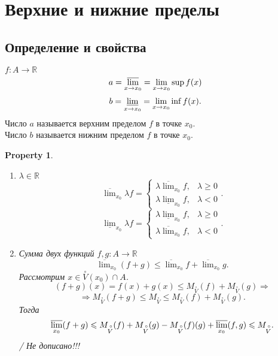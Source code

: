 \documentclass[11pt]{book}
\newcommand{\R}{\mathbb{R}}
\newcommand{\pivi}{\stackrel \circ }
\renewcommand{\le}{\leqslant}
\renewcommand{\ge}{\geqslant}
\theoremstyle{definition}
\theoremstyle{plain}
\theoremstyle{plain}
\newtheorem*{prop}{Property}
\theoremstyle{definition}
\theoremstyle{remark}
\begin{document}
\section{Верхние и нижние пределы}
\subsection{Определение и свойства}\label{ques_30}
\begin{defn}
    $f: A \to \R$\\
    \[
	a = \varlimsup_{x \to x_0}=\lim\limits_{x \to x_0} \sup f(x)
    \]\[
    b = \varliminf_{x \to x_0}=\lim\limits_{x \to x_0} \inf f(x)
    .\] 
    Число $a$ называется верхним пределом $f$ в точке $x_0$. \\
Число $b$ называется нижним пределом $f$ в точке $x_0$.
\end{defn}
\begin{prop}
    \begin{enumerate}
        \item $\lambda \in \R$ 
	    \[
		\overline \lim_{x_0} \lambda f = \left \{
		    \begin{array}{ll}
			\lambda \overline \lim_{x_0} f, & \lambda \ge 0\\
			\lambda \underline \lim_{x_0} f, & \lambda <0
		    \end{array}
		    \right .
	    .\] 
	    \[
		\underline \lim_{x_0} \lambda f = \left \{
		    \begin{array}{ll}
			\lambda \underline \lim_{x_0} f, & \lambda \ge 0\\
			\lambda \overline \lim_{x_0} f, & \lambda <0
		    \end{array}
		    \right .
	    .\] 
	\item Сумма двух функций $f, g : A \to \R$\\
	    \[
		\overline {\lim}_{x_0} (f+g) \le \overline\lim_{x_0} f + \overline \lim_{x_0} g
	    .\] 
	    Рассмотрим $x \in \pivi V(x_0)\cap A$.
	    \[
		(f+g)(x) = f(x) + g(x) \le M_{\pivi V} (f) + M_{\pivi V} (g) \Rightarrow 
	    \] 
	    \[
		\Rightarrow M_{\pivi V}  (f + g) \le M_{\pivi V} \le  M_{\pivi V} (f) + M_{\pivi V} (g) 
	    .\] 
	    Тогда 
	    \[
		\varlimsup _{x_0} (f+g) \le M_{\pivi V} (f) + M_{\pivi V}(g) - M_{\pivi V}(f)(g) + \varlimsup_{x_0}(f, g) \le M_{\pivi V} 
	    .\] 
	    / Не дописано!!!
    \end{enumerate}
\end{prop}
\end{document}
